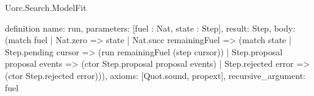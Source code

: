 \begin{lexlean}{Uorc.Search.ModelFit}
\begin{semanticmodule}
definition{
  name: run,
  parameters: [fuel : Nat, state : Step],
  result: Step,
  body: (match fuel
    | Nat.zero => state
    | Nat.succ remainingFuel => (match state
      | Step.pending cursor => (run remainingFuel (step cursor))
      | Step.proposal proposal events => (ctor Step.proposal proposal events)
      | Step.rejected error => (ctor Step.rejected error))),
  axioms: [Quot.sound, propext],
  recursive_argument: fuel
}
\end{semanticmodule}
\end{lexlean}
